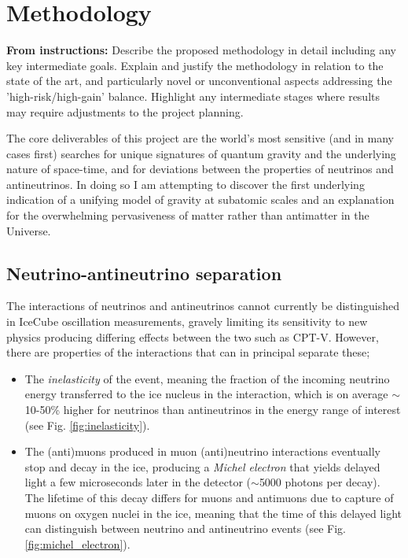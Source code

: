 \documentclass[a4paper,11pt]{article}
\begin{document}
\section{Methodology}
\vspace{0.1 cm}


\textbf{From instructions:} Describe the proposed methodology in detail including any key
intermediate goals. Explain and justify the methodology in relation to the state of the art, and
particularly novel or unconventional aspects addressing the 'high-risk/high-gain' balance. Highlight
any intermediate stages where results may require adjustments to the project planning. 


The core deliverables of this project are the world's most sensitive (and in many cases first) searches for unique signatures of quantum gravity and the underlying nature of space-time, and for deviations between the properties of neutrinos and antineutrinos. In doing so I am attempting to discover the first underlying indication of a unifying model of gravity at subatomic scales and an explanation for the overwhelming pervasiveness of matter rather than antimatter in the Universe.

%

%



\subsection{Neutrino-antineutrino separation}


The interactions of neutrinos and antineutrinos cannot currently be distinguished in IceCube oscillation measurements, gravely limiting its sensitivity to new physics producing differing effects between the two such as CPT-V. However, there are properties of the interactions that can in principal separate these;

\begin{itemize}
    \item The \textit{inelasticity} of the event, meaning the fraction of the incoming neutrino energy transferred to the ice nucleus in the interaction, which is on average $\sim$10-50\%  higher for neutrinos than antineutrinos in the energy range of interest (see Fig. \ref{fig:inelasticity}).
    \item The (anti)muons produced in muon (anti)neutrino interactions eventually stop and decay in the ice, producing a \textit{Michel electron} that yields delayed light a few microseconds later in the detector ($\sim$5000 photons per decay). The lifetime of this decay differs for muons and antimuons due to capture of muons on oxygen nuclei in the ice, meaning that the time of this delayed light can distinguish between neutrino and antineutrino events (see Fig. \ref{fig:michel_electron}). 
\end{itemize}
\end{document}
